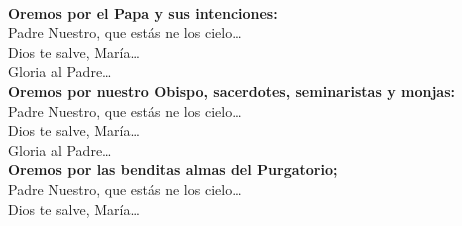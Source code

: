 \documentclass[10pt,oneside]{book}
\begin{document}
\vspace{3mm}

\begin{paracol}{2}  
      
      
      \switchcolumn
      
                                                                            
\end{paracol}

\vspace{3mm}

\begin{paracol}{2}  
      \\[1mm]
      \textbf{Oremos por el Papa y sus intenciones:}\\
      \hspace*{5mm}Padre Nuestro, que estás ne los cielo\ldots\\
      \hspace*{5mm}Dios te salve, María\ldots\\
      \hspace*{5mm}Gloria al Padre\ldots\\[2mm]
      \textbf{Oremos por nuestro Obispo, sacerdotes, seminaristas y monjas:}\\
      \hspace*{5mm}Padre Nuestro, que estás ne los cielo\ldots\\
      \hspace*{5mm}Dios te salve, María\ldots\\
      \hspace*{5mm}Gloria al Padre\ldots\\[2mm]
      \textbf{Oremos por las benditas almas del Purgatorio;}\\
      \hspace*{5mm}Padre Nuestro, que estás ne los cielo\ldots\\
      \hspace*{5mm}Dios te salve, María\ldots\\
      \hspace*{2.5mm}
      
      \switchcolumn
      

\end{paracol}
\end{document}
